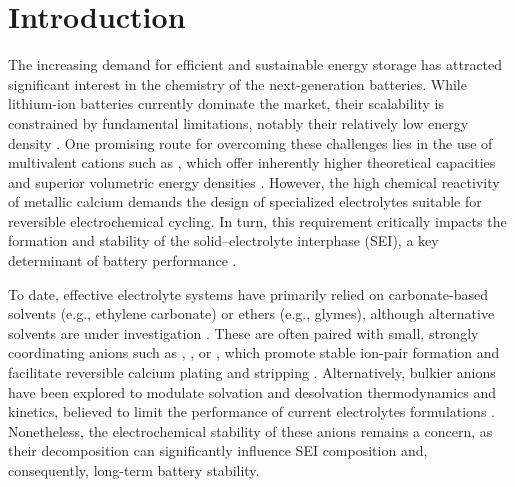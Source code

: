 \documentclass[twoside,twocolumn,9pt]{article}
\begin{document}
\section{Introduction}

The increasing demand for efficient and sustainable energy storage has attracted significant interest in the chemistry of the next-generation batteries. 
While lithium-ion batteries currently dominate the market, their scalability is constrained by fundamental limitations, notably their relatively low energy density \cite{li30YearsLithiumIon2018}. 
One promising route for overcoming these challenges lies in the use of multivalent cations such as , which offer inherently higher theoretical capacities and superior volumetric energy densities \cite{arroyo-dedompabloAchievementsChallengesProspects2020,taghavi-kahaghPoweringFutureComprehensive2024,wangChallengesProgressAnodeElectrolyte2024}. 
However, the high chemical reactivity of metallic calcium demands the design of specialized electrolytes suitable for reversible electrochemical cycling. 
In turn, this requirement critically impacts the formation and stability of the solid–electrolyte interphase (SEI), a key determinant of battery performance \cite{zhaoRevealingSolidElectrolyte2022}.

To date, effective electrolyte systems have primarily relied on carbonate-based solvents (e.g., ethylene carbonate) or ethers (e.g., glymes), although alternative solvents  are under investigation \cite{biriaPlatingStrippingCalcium2020}. 
These are often paired with small, strongly coordinating anions such as , , or , which promote stable ion-pair formation and facilitate reversible calcium plating and stripping \cite{biriaPlatingStrippingCalcium2019,hahnCriticalRoleConfigurational2020,melemedCurrentUnderstandingNonaqueous2020,forero-saboyaBoronbasedElectrolyteAdditive2021,bodinBoronBasedFunctionalAdditives2023}. 
Alternatively, bulkier anions have been explored to modulate solvation and desolvation thermodynamics and kinetics, believed to limit the performance of current electrolytes formulations \cite{melemedCurrentUnderstandingNonaqueous2020,songCurrentStatusChallenges2022,melemedImpactDifferentialCa22023}. 
Nonetheless, the electrochemical stability of these anions remains a concern, as their decomposition can significantly influence SEI composition and, consequently, long-term battery stability.
\end{document}
